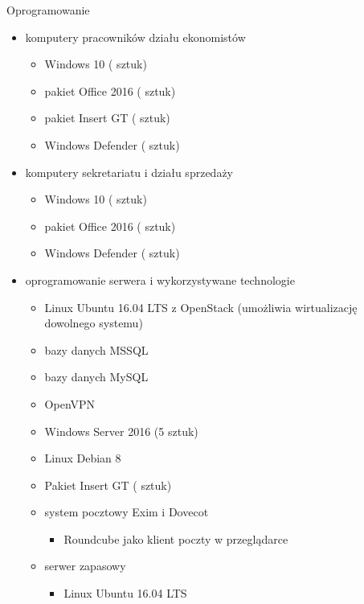 Oprogramowanie
\begin{itemize}
	\item komputery pracowników działu ekonomistów
	\begin{itemize}
		\item Windows 10 ( sztuk)
		\item pakiet Office 2016 ( sztuk)
		\item pakiet Insert GT ( sztuk)
		\item Windows Defender ( sztuk)
	\end{itemize}
	\item komputery sekretariatu i działu sprzedaży
	\begin{itemize}
		\item Windows 10 ( sztuk)
		\item pakiet Office 2016 ( sztuk)
		\item Windows Defender ( sztuk)
	\end{itemize}
	\item oprogramowanie serwera i wykorzystywane technologie
	\begin{itemize}
		\item Linux Ubuntu 16.04 LTS z OpenStack (umożliwia wirtualizację
		dowolnego systemu)
		\item bazy danych MSSQL
		\item bazy danych MySQL
		\item OpenVPN
		\item Windows Server 2016 (5 sztuk)
		\item Linux Debian 8
		\item Pakiet Insert GT ( sztuk)
		\item system pocztowy Exim i Dovecot
		\begin{itemize}
			\item Roundcube jako klient poczty w przeglądarce
		\end{itemize}
		\item serwer zapasowy
		\begin{itemize}
			\item Linux Ubuntu 16.04 LTS
		\end{itemize} 
	\end{itemize}
\end{itemize}
